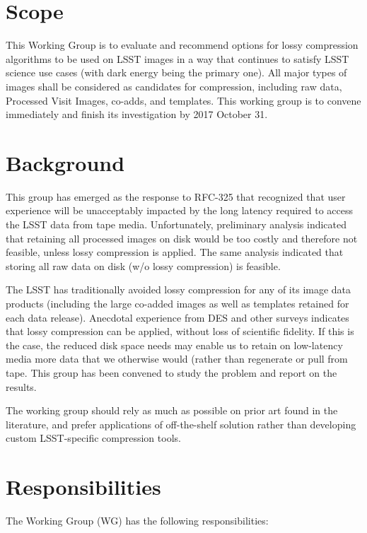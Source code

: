 
\section{Scope}

This Working Group is to evaluate and recommend options for lossy compression 
algorithms to be used on LSST images in a way that continues to satisfy LSST 
science use cases (with dark energy being the primary one). All major types 
of images shall be considered as candidates for compression, including raw 
data, Processed Visit Images, co-adds, and templates.  This working group is 
to convene immediately and finish its investigation by 2017 October 31.

\section{Background}

This group has emerged as the response to RFC-325 that recognized that user 
experience will be unacceptably impacted by the long latency required to 
access the LSST data from tape media. Unfortunately, preliminary analysis
indicated that retaining all processed images on disk would be too costly 
and therefore not feasible, unless lossy compression is applied. The same
analysis indicated that storing all raw data on disk (w/o lossy compression)
is feasible.

The LSST has traditionally avoided lossy compression for any of its image 
data products (including the large co-added images as well as templates 
retained for each data release). Anecdotal experience from DES and other 
surveys indicates that lossy compression can be applied, without loss of 
scientific fidelity. If this is the case, the reduced disk space needs may 
enable us to retain on low-latency media more data that we otherwise would 
(rather than regenerate or pull from tape. This group has been convened to 
study the problem and report on the results.

The working group should rely as much as possible on prior art found in the
literature, and prefer applications of off-the-shelf solution rather than 
developing custom LSST-specific compression tools.

\section{Responsibilities}

The Working Group (WG) has the following responsibilities:

